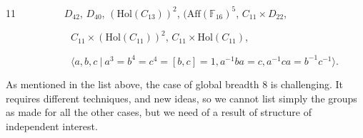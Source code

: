 \documentclass{amsart}
\theoremstyle{definition}
\numberwithin{equation}{section}
\begin{document}
\medskip
\medskip

11 \ \ \ \ \ \ \ \ \ $D_{42}$, $D_{40}$, ${(\mathrm{Hol}(C_{13}))}^2$, ${(\mathrm{Aff}(\mathbb{F}_{16})}^5$, $C_{11} \times D_{22}$, 


\medskip



\ \ \ \ \ \ \ \ \ \ \  \ \                       $ C_{11} \times {(\mathrm{Hol}(C_{11}))}^2$, $C_{11} \times \mathrm{Hol}(C_{11})$,

\medskip



\ \ \ \ \ \ \ \ \ \ \  \ \                 $ \langle a,b,c \ | \ a^3 = b^4 = c^4 = [b,c] = 1, a^{-1}ba = c,  a^{-1}ca = b^{-1}c^{-1}\rangle $. 


\medskip
\medskip

As mentioned in the list above, the case of global breadth $8$ is challenging. It requires different techniques, and new ideas, so we cannot list simply the groups as made for all the other cases, but we need of a result of structure of independent interest.
\end{document}
